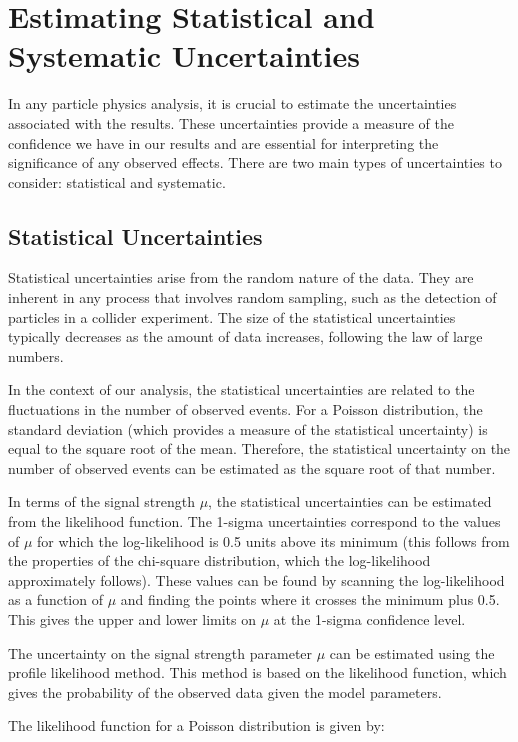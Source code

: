 \section{Estimating Statistical and Systematic Uncertainties}

In any particle physics analysis, it is crucial to estimate the uncertainties associated with the results. These
uncertainties provide a measure of the confidence we have in our results and are essential for interpreting the
significance of any observed effects. There are two main types of uncertainties to consider: statistical and systematic.

\subsection{Statistical Uncertainties}

Statistical uncertainties arise from the random nature of the data. They are inherent in any process that involves
random sampling, such as the detection of particles in a collider experiment. The size of the statistical uncertainties
typically decreases as the amount of data increases, following the law of large numbers.

In the context of our analysis, the statistical uncertainties are related to the fluctuations in the number of observed
events. For a Poisson distribution, the standard deviation (which provides a measure of the statistical uncertainty) is
equal to the square root of the mean. Therefore, the statistical uncertainty on the number of observed events can be
estimated as the square root of that number.

In terms of the signal strength $\mu$, the statistical uncertainties can be estimated from the likelihood function. The
1-sigma uncertainties correspond to the values of $\mu$ for which the log-likelihood is 0.5 units above its minimum
(this follows from the properties of the chi-square distribution, which the log-likelihood approximately follows). These
values can be found by scanning the log-likelihood as a function of $\mu$ and finding the points where it crosses the
minimum plus 0.5. This gives the upper and lower limits on $\mu$ at the 1-sigma confidence level.

The uncertainty on the signal strength parameter $\mu$ can be estimated using the profile likelihood method. This method
is based on the likelihood function, which gives the probability of the observed data given the model parameters.

The likelihood function for a Poisson distribution is given by:

